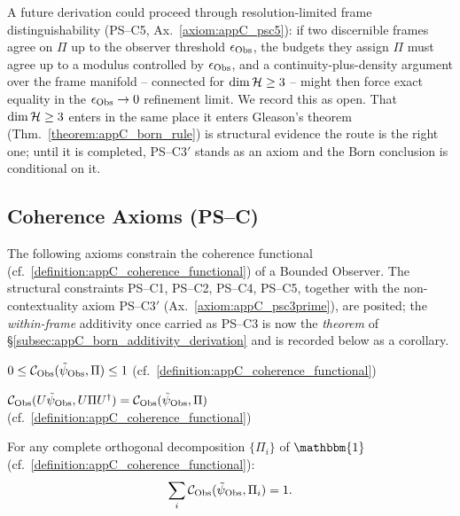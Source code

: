 \begin{remark}
\label{remark:appC_psc3prime_open_route}
A future derivation could proceed through resolution-limited frame distinguishability
(PS--C5, Ax.~\ref{axiom:appC_psc5}): if two discernible frames agree on $\Pi$ up to the
observer threshold $\epsilon_{\mathrm{Obs}}$, the budgets they assign $\Pi$ must agree up to a
modulus controlled by $\epsilon_{\mathrm{Obs}}$, and a continuity-plus-density argument over the
frame manifold -- connected for $\dim\mathcal{H} \ge 3$ -- might then force exact equality
in the $\epsilon_{\mathrm{Obs}} \to 0$ refinement limit. We record this as open. That
$\dim\mathcal{H} \ge 3$ enters in the same place it enters Gleason's theorem
(Thm.~\ref{theorem:appC_born_rule}) is structural evidence the route is the right one;
until it is completed, PS--C3$'$ stands as an axiom and the Born conclusion is
conditional on it.
\end{remark}

\subsection{Coherence Axioms (PS–C)}
\label{subsec:appC_born_axioms}
The following axioms constrain the coherence functional (cf.~\ref{definition:appC_coherence_functional}) of a Bounded Observer. The structural constraints
PS--C1, PS--C2, PS--C4, PS--C5, together with the non-contextuality axiom PS--C3$'$
(Ax.~\ref{axiom:appC_psc3prime}), are posited; the \emph{within-frame} additivity once
carried as PS--C3 is now the \emph{theorem} of
\S\ref{subsec:appC_born_additivity_derivation} and is recorded below as a corollary.

\begin{axiom}[PS--C1 (Boundedness)]
\label{axiom:appC_psc1}
$0 \leq \mathcal{C}_{\mathrm{Obs}}(\tilde\psi_{\mathrm{Obs}}, \Pi) \leq 1$ \quad (cf.~\ref{definition:appC_coherence_functional})
\end{axiom}

\begin{axiom}
\label{axiom:appC_psc2}
$\mathcal{C}_{\mathrm{Obs}}(U \tilde\psi_{\mathrm{Obs}}, U \Pi U^\dagger)
= \mathcal{C}_{\mathrm{Obs}}(\tilde\psi_{\mathrm{Obs}}, \Pi)$ \quad (cf.~\ref{definition:appC_coherence_functional})
\end{axiom}

\begin{corollary}
\label{axiom:appC_psc3}
For any complete orthogonal decomposition $\{\Pi_i\}$ of $\mathbbm{1}$ (cf.~\ref{definition:appC_coherence_functional}):
\[
\sum_i \mathcal{C}_{\mathrm{Obs}}(\tilde\psi_{\mathrm{Obs}}, \Pi_i) = 1.
\]
\end{corollary}

